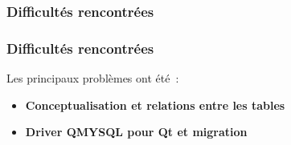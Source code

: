 \subsubsection{Difficultés rencontrées}
\begin{frame}
\frametitle{Difficultés rencontrées}
Les principaux problèmes ont été~:
\begin{itemize}
\item<2-> \textbf{Conceptualisation et relations entre les tables}
\item<3-> \textbf{Driver QMYSQL pour Qt et migration}
\end{itemize}
\end{frame}
